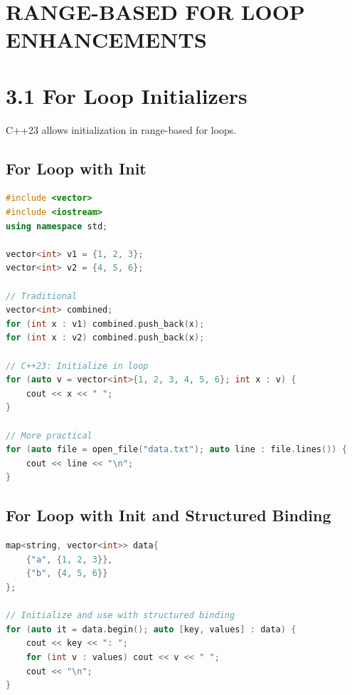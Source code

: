 \hypertarget{range-based-for-loop-enhancements}{%
\section{RANGE-BASED FOR LOOP
ENHANCEMENTS}\label{range-based-for-loop-enhancements}}

\hypertarget{for-loop-initializers}{%
\section{3.1 For Loop Initializers}\label{for-loop-initializers}}

C++23 allows initialization in range-based for loops.

\hypertarget{for-loop-with-init}{%
\subsection{For Loop with Init}\label{for-loop-with-init}}

\begin{lstlisting}[language={C++}]
#include <vector>
#include <iostream>
using namespace std;

vector<int> v1 = {1, 2, 3};
vector<int> v2 = {4, 5, 6};

// Traditional
vector<int> combined;
for (int x : v1) combined.push_back(x);
for (int x : v2) combined.push_back(x);

// C++23: Initialize in loop
for (auto v = vector<int>{1, 2, 3, 4, 5, 6}; int x : v) {
    cout << x << " ";
}

// More practical
for (auto file = open_file("data.txt"); auto line : file.lines()) {
    cout << line << "\n";
}
\end{lstlisting}

\hypertarget{for-loop-with-init-and-structured-binding}{%
\subsection{For Loop with Init and Structured
Binding}\label{for-loop-with-init-and-structured-binding}}

\begin{lstlisting}[language={C++}]
map<string, vector<int>> data{
    {"a", {1, 2, 3}},
    {"b", {4, 5, 6}}
};

// Initialize and use with structured binding
for (auto it = data.begin(); auto [key, values] : data) {
    cout << key << ": ";
    for (int v : values) cout << v << " ";
    cout << "\n";
}
\end{lstlisting}

